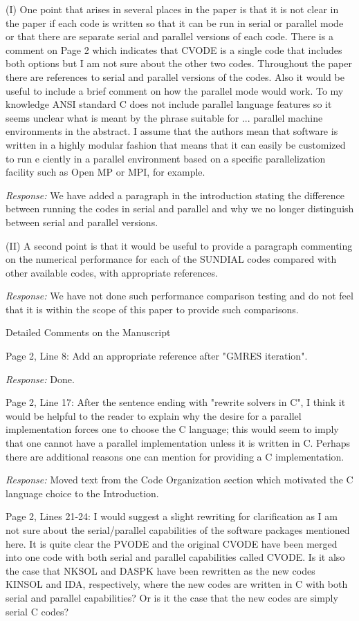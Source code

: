 \documentclass[12pt]{letter}
\begin{document}
(I) One point that arises in several places in the paper is that it is
not clear in the paper if each code is written so that it can be run
in serial or parallel mode or that there are separate serial and
parallel versions of each code. There is a comment on Page 2 which
indicates that CVODE is a single code that includes both options but I
am not sure about the other two codes.  Throughout the paper there are
references to serial and parallel versions of the codes.  Also it
would be useful to include a brief comment on how the parallel mode
would work.  To my knowledge ANSI standard C does not include parallel
language features so it seems unclear what is meant by the phrase
suitable for ... parallel machine environments in the abstract.  I
assume that the authors mean that software is written in a highly
modular fashion that means that it can easily be customized to run e
ciently in a parallel environment based on a specific parallelization
facility such as Open MP or MPI, for example.

{\em Response: } We have added a paragraph in the introduction
stating the difference between running the codes in serial and
parallel and why we no longer distinguish between serial and
parallel versions.

(II) A second point is that it would be useful to provide a
paragraph commenting on the numerical performance for each of the
SUNDIAL codes compared with other available codes, with
appropriate references.

{\em Response: } We have not done such performance comparison
testing and do not feel that it is within the scope of this paper
to provide such comparisons.

Detailed Comments on the Manuscript

Page 2, Line 8: Add an appropriate reference after "GMRES iteration".

{\em Response: } Done.

Page 2, Line 17: After the sentence ending with "rewrite solvers in C",
I think it would be helpful to the reader to explain why the desire
for a parallel implementation forces one to choose the C language;
this would seem to imply that one cannot have a parallel
implementation unless it is written in C. Perhaps there are additional
reasons one can mention for providing a C implementation.

{\em Response: } Moved text from the Code Organization section
which motivated the C language choice to the Introduction.

Page 2, Lines 21-24: I would suggest a slight rewriting for
clarification as I am not sure about the serial/parallel capabilities
of the software packages mentioned here. It is quite clear the PVODE
and the original CVODE have been merged into one code with both serial
and parallel capabilities called CVODE. Is it also the case that NKSOL
and DASPK have been rewritten as the new codes KINSOL and IDA,
respectively, where the new codes are written in C with both serial
and parallel capabilities? Or is it the case that the new codes are
simply serial C codes?
\end{document}
